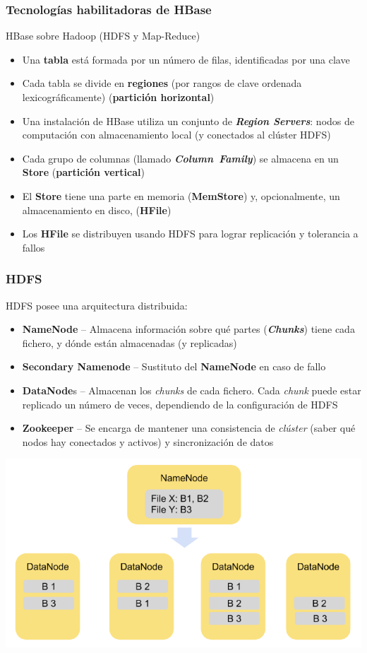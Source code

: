 \documentclass[14pt]{beamer}
\begin{document}
\begin{frame}[allowframebreaks]
  \frametitle{Tecnologías habilitadoras de HBase}
HBase sobre Hadoop (HDFS y Map-Reduce)
\begin{itemize}
\item Una {\bf tabla} está formada por un número de filas, identificadas
  por una clave
\item Cada tabla se divide en {\bf regiones} (por rangos de clave ordenada
  lexicográficamente) ({\bf partición horizontal})
\item Una instalación de HBase utiliza un conjunto de {\bfseries\itshape
    Region Servers}: nodos de computación con almacenamiento local (y
  conectados al clúster HDFS)

\framebreak

\item Cada grupo de columnas (llamado {\bfseries\itshape Column~Family\/})
  se almacena en un {\bf Store} ({\bf partición vertical})
\item El {\bf Store} tiene una parte en memoria ({\bf MemStore}) y,
  opcionalmente, un almacenamiento en disco, ({\bf HFile})
\item Los {\bf HFile} se distribuyen usando HDFS para lograr replicación y
  tolerancia a fallos
\end{itemize}
\end{frame}

\begin{frame}[allowframebreaks]
  \frametitle{HDFS}
HDFS posee una arquitectura distribuida:
    \begin{itemize}
    \item {\bf NameNode} -- Almacena información sobre qué partes
      ({\bfseries\itshape Chunks}) tiene cada fichero, y dónde están
      almacenadas (y replicadas)
    \item {\bf Secondary Namenode} -- Sustituto del {\bf NameNode} en caso
      de fallo
    \item {\bf DataNode}s -- Almacenan los {\em chunks\/} de cada fichero.
      Cada {\em chunk} puede estar replicado un número de veces,
      dependiendo de la configuración de HDFS
    \item {\bf Zookeeper} -- Se encarga de mantener una consistencia de
      {\em clúster} (saber qué nodos hay conectados y activos) y
      sincronización de datos
    \end{itemize}
  \includegraphics[width=\textwidth]{img/hdfs1}
\end{frame}
\end{document}
